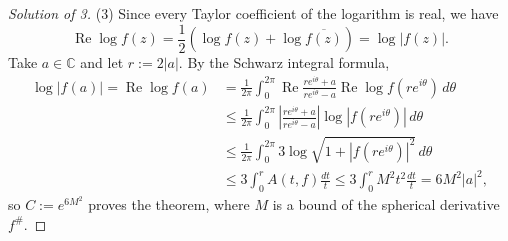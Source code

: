 \documentclass[a4paper]{article}
\theoremstyle{definition}
\renewcommand{\Re}{\operatorname{Re}}
\newcommand{\C}{\mathbb{C}}
\renewcommand{\bar}{\overline}
\begin{document}
\begin{proof}[Solution of 3]
(3)
Since every Taylor coefficient of the logarithm is real, we have
\[\Re\log f(z)=\frac12(\log f(z)+\log\bar{f(z)})=\log|f(z)|.\]
Take $a\in\C$ and let $r:=2|a|$.
By the Schwarz integral formula,
\begin{align*}
\log|f(a)|=\Re\log f(a)&=\frac1{2\pi}\int_0^{2\pi}\Re\frac{re^{i\theta}+a}{re^{i\theta}-a}\Re\log f(re^{i\theta})\,d\theta\\
&\le\frac1{2\pi}\int_0^{2\pi}\left|\frac{re^{i\theta}+a}{re^{i\theta}-a}\right|\log|f(re^{i\theta})|\,d\theta\\
&\le\frac1{2\pi}\int_0^{2\pi}3\log\sqrt{1+|f(re^{i\theta})|^2}\,d\theta\\
&\le3\int_0^rA(t,f)\frac{dt}t\le3\int_0^rM^2t^2\frac{dt}t=6M^2|a|^2,
\end{align*}
so $C:=e^{6M^2}$ proves the theorem, where $M$ is a bound of the spherical derivative $f^\#$.
\end{proof}
\end{document}
